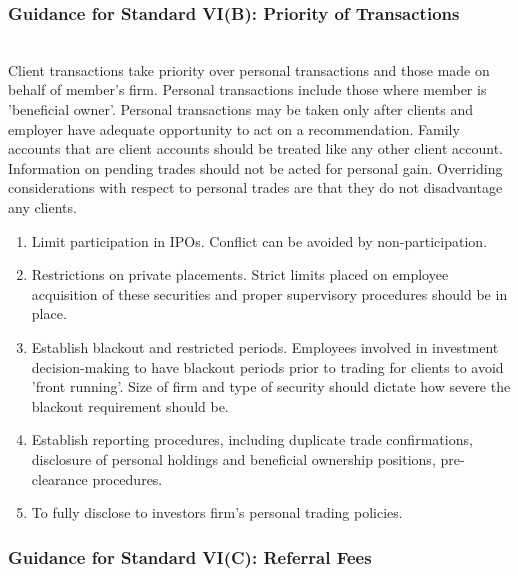 \subsubsection{Guidance for Standard VI(B): Priority of Transactions}

\begin{remark} \\
Client transactions take priority over personal transactions and those made on behalf of member's firm. Personal transactions include those where member is 'beneficial owner'. Personal transactions may be taken only after clients and employer have adequate opportunity to act on a recommendation. Family accounts that are client accounts should be treated like any other client account.\\
Information on pending trades should not be acted for personal gain. Overriding considerations with respect to personal trades are that they do not disadvantage any clients.
\end{remark}

\begin{remark} 
\begin{enumerate}[label=\roman*.]
\setlength{\itemsep}{0pt}
\item Limit participation in IPOs. Conflict can be avoided by non-participation.
\item Restrictions on private placements. Strict limits placed on employee acquisition of these securities and proper supervisory procedures should be in place.
\item Establish blackout and restricted periods. Employees involved in investment decision-making to have blackout periods prior to trading for clients to avoid 'front running'. Size of firm and type of security should dictate how severe the blackout requirement should be.
\item Establish reporting procedures, including duplicate trade confirmations, disclosure of personal holdings and beneficial ownership positions, pre-clearance procedures.
\item To fully disclose to investors firm's personal trading policies.
\end{enumerate}
\end{remark}

\subsubsection{Guidance for Standard VI(C): Referral Fees}

